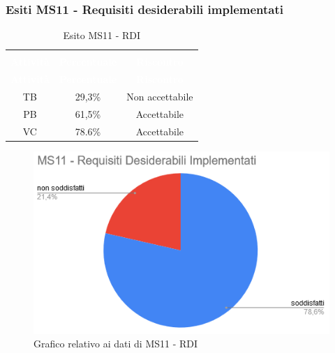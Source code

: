 \subsubsection{Esiti MS11 - Requisiti desiderabili implementati}
\begin{longtable}{c c c}
\rowcolor{white}\caption{Esito MS11 - RDI} \\
	\rowcolor{redafk}
\textcolor{white}{\textbf{Attività}} &
\textcolor{white}{\textbf{Percentuale}} & 
\textcolor{white}{\textbf{Riscontro}} \\
	\endfirsthead
\textcolor{white}{\textbf{Attività}} &
\textcolor{white}{\textbf{Percentuale}} & 
\textcolor{white}{\textbf{Riscontro}} \\
	\endhead
	TB & 29,3\% & Non accettabile \\
	PB & 61,5\% & Accettabile \\
	VC & 78.6\% & Accettabile \\
\end{longtable}

\begin{figure}[H]
\centering
\includegraphics[scale=0.7]{./img/MS11.png}
\caption{Grafico relativo ai dati di MS11 - RDI}
\end{figure}

